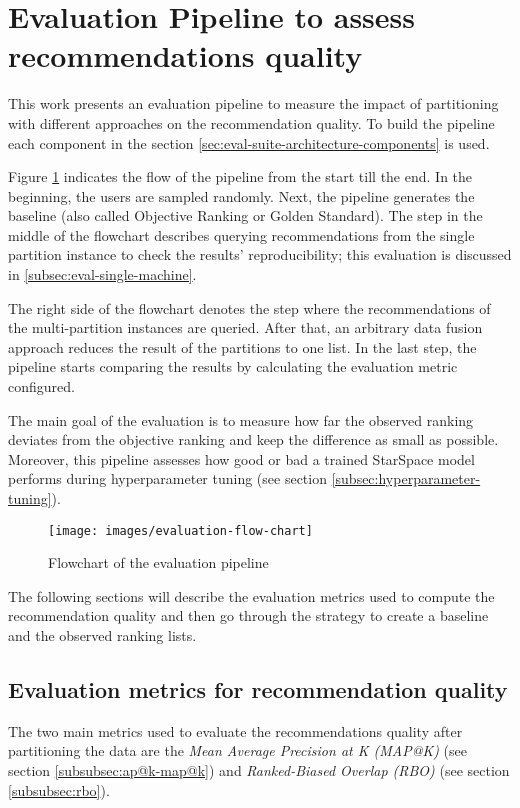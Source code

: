 \section{Evaluation Pipeline to assess recommendations quality}
\label{sec:evaluation-pipeline}
This work presents an evaluation pipeline to measure the impact of partitioning with different approaches on the recommendation quality. To build the pipeline each component in the section \ref{sec:eval-suite-architecture-components} is used. 

Figure \ref{fig:flowchart-evaluation-pipeline} indicates the flow of the pipeline from the start till the end. In the beginning, the users are sampled randomly. Next, the pipeline generates the baseline (also called Objective Ranking or Golden Standard). The step in the middle of the flowchart describes querying recommendations from the single partition instance to check the results' reproducibility; this evaluation is discussed in \ref{subsec:eval-single-machine}. 


The right side of the flowchart denotes the step where the recommendations of the multi-partition instances are queried. After that, an arbitrary data fusion approach reduces the result of the partitions to one list. In the last step, the pipeline starts comparing the results by calculating the evaluation metric configured. 

The main goal of the evaluation is to measure how far the observed ranking deviates from the objective ranking and keep the difference as small as possible. Moreover, this pipeline assesses how good or bad a trained StarSpace model performs during hyperparameter tuning (see section \ref{subsec:hyperparameter-tuning}).

\begin{figure}[!htb]
    \centering
    \texttt{[image: images/evaluation-flow-chart]}
    \caption{Flowchart of the evaluation pipeline}
    \label{fig:flowchart-evaluation-pipeline}
\end{figure}

The following sections will describe the evaluation metrics used to compute the recommendation quality and then go through the strategy to create a baseline and the observed ranking lists.

\subsection{Evaluation metrics for recommendation quality}
\label{subsec:evaluation-metrics-for-recommendation-quality}
The two main metrics used to evaluate the recommendations quality after partitioning the data are the \emph{Mean Average Precision at K (MAP@K)} (see section \ref{subsubsec:ap@k-map@k})  and \emph{Ranked-Biased Overlap (RBO)} (see section \ref{subsubsec:rbo}). 


